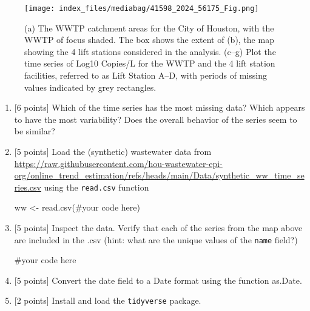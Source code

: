 \documentclass[
  letterpaper,
  DIV=11,
  numbers=noendperiod]{scrreprt}
\newenvironment{Shaded}{\begin{snugshade}}{\end{snugshade}}
\newcommand{\CommentTok}[1]{\textcolor[rgb]{0.37,0.37,0.37}{#1}}
\newcommand{\FunctionTok}[1]{\textcolor[rgb]{0.28,0.35,0.67}{#1}}
\newcommand{\NormalTok}[1]{\textcolor[rgb]{0.00,0.23,0.31}{#1}}
\newcommand{\OtherTok}[1]{\textcolor[rgb]{0.00,0.23,0.31}{#1}}
\newcommand{\SpecialCharTok}[1]{\textcolor[rgb]{0.37,0.37,0.37}{#1}}
\begin{document}
\begin{figure}[H]

{\centering \texttt{[image: index\_files/mediabag/41598\_2024\_56175\_Fig.png]}

}

\caption{(a) The WWTP catchment areas for the City of Houston, with the
WWTP of focus shaded. The box shows the extent of (b), the map showing
the 4 lift stations considered in the analysis. (c--g) Plot the time
series of Log10 Copies/L for the WWTP and the 4 lift station facilities,
referred to as Lift Station A--D, with periods of missing values
indicated by grey rectangles.}

\end{figure}%

\begin{enumerate}
\def\labelenumi{\arabic{enumi}.}
\item
  {[}6 points{]} Which of the time series has the most missing data?
  Which appears to have the most variability? Does the overall behavior
  of the series seem to be similar?
\item
  {[}5 points{]} Load the (synthetic) wastewater data from
  \url{https://raw.githubusercontent.com/hou-wastewater-epi-org/online_trend_estimation/refs/heads/main/Data/synthetic_ww_time_series.csv}
  using the \texttt{read.csv} function

\begin{Shaded}
\begin{Highlighting}[]
\NormalTok{ww }\OtherTok{\textless{}{-}} \FunctionTok{read.csv}\NormalTok{(}\CommentTok{\#your code here)}
\end{Highlighting}
\end{Shaded}
\item
  {[}5 points{]} Inspect the data. Verify that each of the series from
  the map above are included in the .csv (hint: what are the unique
  values of the \texttt{name} field?)

\begin{Shaded}
\begin{Highlighting}[]
\CommentTok{\#your code here}
\end{Highlighting}
\end{Shaded}
\item
  {[}5 points{]} Convert the date field to a Date format using the
  function as.Date.

\begin{Shaded}
\end{Shaded}
\item
  {[}2 points{]} Install and load the \texttt{tidyverse} package.


\end{enumerate}
\end{document}
